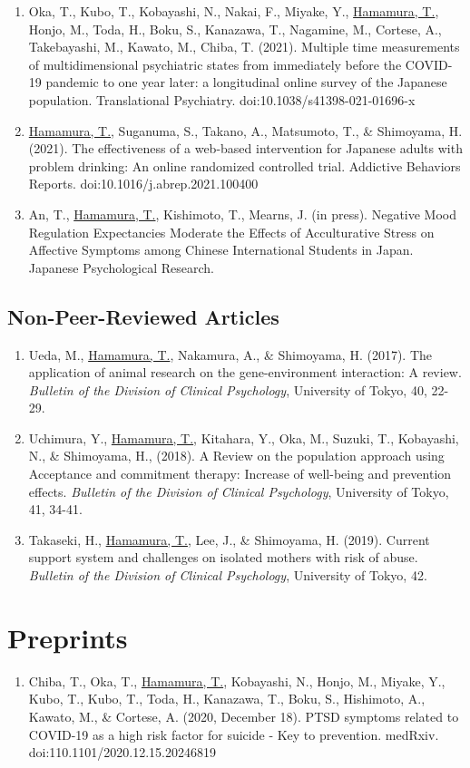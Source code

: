\documentclass{article}
\begin{document}
\begin{enumerate}
	\item Oka, T., Kubo, T., Kobayashi, N., Nakai, F., Miyake, Y., \underline{Hamamura, T.}, Honjo, M., Toda, H., Boku, S., Kanazawa, T., Nagamine, M.,  Cortese, A., Takebayashi, M., Kawato, M., Chiba, T. (2021). Multiple time measurements of multidimensional psychiatric states from immediately before the COVID-19 pandemic to one year later: a longitudinal online survey of the Japanese population. Translational Psychiatry. doi:10.1038/s41398-021-01696-x
	\item \underline{Hamamura, T.}, Suganuma, S., Takano, A., Matsumoto, T., \& Shimoyama, H. (2021). The effectiveness of a web-based intervention for Japanese adults with problem drinking: An online randomized controlled trial. Addictive Behaviors Reports. doi:10.1016/j.abrep.2021.100400	
	\item An, T., \underline{Hamamura, T.}, Kishimoto, T., Mearns, J. (in press). Negative Mood Regulation Expectancies Moderate the Effects of Acculturative Stress on Affective Symptoms among Chinese International Students in Japan. Japanese Psychological Research.
\end{enumerate}

\subsection{Non-Peer-Reviewed Articles}
\begin{enumerate}
	\item Ueda, M., \underline{Hamamura, T.}, Nakamura, A., \& Shimoyama, H. (2017). The application of animal research on the gene-environment interaction: A review. \textit{Bulletin of the Division of Clinical Psychology}, University of Tokyo, 40, 22-29.
	\item Uchimura, Y., \underline{Hamamura, T.}, Kitahara, Y., Oka, M., Suzuki, T., Kobayashi, N., \& Shimoyama, H., (2018). A Review on the population approach using Acceptance and commitment therapy: Increase of well-being and prevention effects. \textit{Bulletin of the Division of Clinical Psychology}, University of Tokyo, 41, 34-41.
	\item Takaseki, H., \underline{Hamamura, T.}, Lee, J., \& Shimoyama, H. (2019). Current support system and challenges on isolated mothers with risk of abuse. \textit{Bulletin of the Division of Clinical Psychology}, University of Tokyo, 42.
\end{enumerate}

\section{Preprints}
\begin{enumerate}
	\item Chiba, T., Oka, T., \underline{Hamamura, T.}, Kobayashi, N., Honjo, M., Miyake, Y., Kubo, T., Kubo, T., Toda, H., Kanazawa, T., Boku, S., Hishimoto, A., Kawato, M., \& Cortese, A. (2020, December 18). PTSD symptoms related to COVID-19 as a high risk factor for suicide - Key to prevention. medRxiv. doi:110.1101/2020.12.15.20246819
\end{enumerate}
	 
\end{document}
